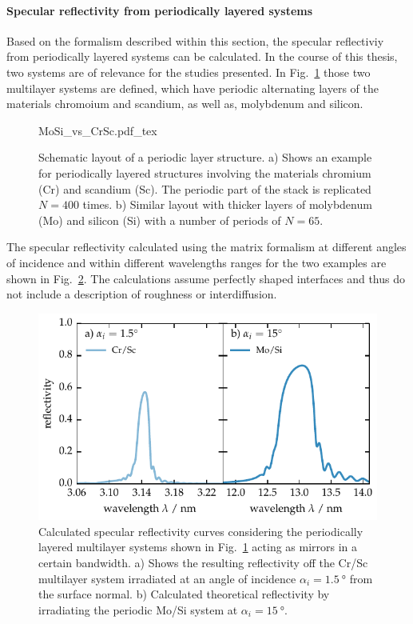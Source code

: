 \paragraph{Specular reflectivity from periodically layered systems}
Based on the formalism described within this section, the specular reflectiviy from periodically layered systems can be calculated. In the course of this thesis, two systems are of relevance for the studies presented. In Fig.~\ref{ch_theo:fig_MoSi_vs_CrSc_model} those two multilayer systems are defined, which have periodic alternating layers of the materials chromoium and scandium, as well as, molybdenum and silicon.
\begin{figure}[htbp]
    \def\svgwidth{0.67\textwidth}
    {MoSi_vs_CrSc.pdf_tex}
    \caption[Schematic layout of periodic multilayer systems]{Schematic layout of a periodic layer structure. a) Shows an example for periodically layered structures involving the materials chromium (Cr) and scandium (Sc). The periodic part of the stack is replicated $N=400$ times. b) Similar layout with thicker layers of molybdenum (Mo) and silicon (Si) with a number of periods of $N=65$.}
    \label{ch_theo:fig_MoSi_vs_CrSc_model}
\end{figure}
The specular reflectivity calculated using the matrix formalism at different angles of incidence and within different wavelengths ranges for the two examples are shown in Fig.~\ref{ch_theo:fig_MoSi_vs_CrSc_sim}. The calculations assume perfectly shaped interfaces and thus do not include a description of roughness or interdiffusion.
\begin{figure}[htb]
        \includegraphics{img/MoSi_vs_CrSc}
        \caption[Specular reflectivity from periodic multilayer systems]{%
            Calculated specular reflectivity curves considering the periodically layered multilayer systems shown in Fig.~\ref{ch_theo:fig_MoSi_vs_CrSc_model} acting as mirrors in a certain bandwidth. a) Shows the resulting reflectivity off the Cr/Sc multilayer system irradiated at an angle of incidence $\alpha_i=\SI{1.5}{\degree}$ from the surface normal. b) Calculated theoretical reflectivity by irradiating the periodic Mo/Si system at $\alpha_i=\SI{15}{\degree}$.}
        \label{ch_theo:fig_MoSi_vs_CrSc_sim}
\end{figure}

